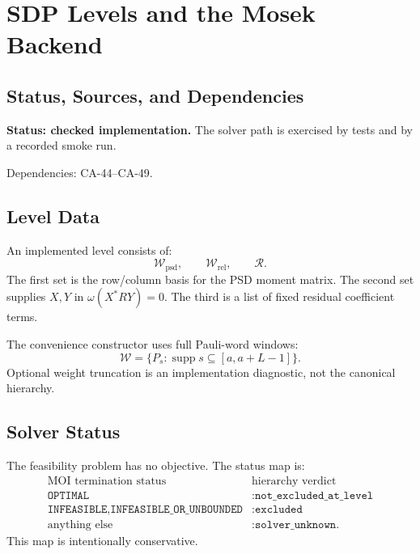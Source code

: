 
\section{SDP Levels and the Mosek Backend}
\label{sec:qubit-sdp-levels-and-mosek-backend}

\subsection{Status, Sources, and Dependencies}

\textbf{Status: checked implementation.}  The solver path is exercised by
tests and by a recorded smoke run.

Dependencies: CA-44--CA-49.


\subsection{Level Data}

An implemented level consists of:
\[
  \mathcal W_{\mathrm{psd}},\qquad
  \mathcal W_{\mathrm{rel}},\qquad
  \mathcal R.
\]
The first set is the row/column basis for the PSD moment matrix.  The second
set supplies \(X,Y\) in \(\omega(X^*RY)=0\).  The third is a list of fixed
residual coefficient terms.

The convenience constructor uses full Pauli-word windows:
\[
  \mathcal W=\{P_s:\operatorname{supp}s\subseteq
  [a,a+L-1]\}.
\]
Optional weight truncation is an implementation diagnostic, not the canonical
hierarchy.

\subsection{Solver Status}

The feasibility problem has no objective.  The status map is:
\[
\begin{array}{c|c}
\text{MOI termination status}&\text{hierarchy verdict}\\ \hline
\texttt{OPTIMAL}&\texttt{:not\_excluded\_at\_level}\\
\texttt{INFEASIBLE},\texttt{INFEASIBLE\_OR\_UNBOUNDED}&\texttt{:excluded}\\
\text{anything else}&\texttt{:solver\_unknown}.
\end{array}
\]
This map is intentionally conservative.

